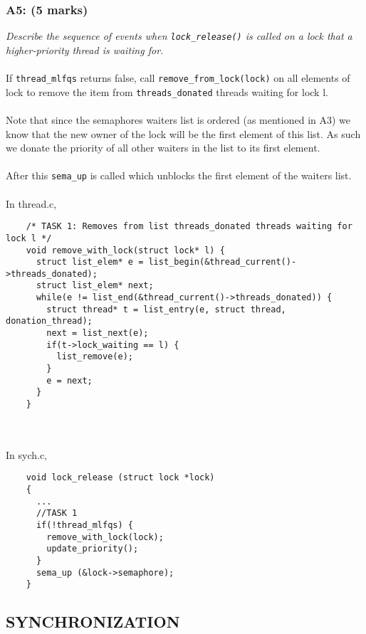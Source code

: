 \documentclass{article}
\begin{document}
\subsubsection*{A5: (5 marks) }
\textit{Describe the sequence of events when \texttt{lock\_release()} is called on a lock that a higher-priority thread is waiting for.}
\\ \\
If \texttt{thread\_mlfqs} returns false, call \texttt{remove\_from\_lock(lock)} on all elements of lock to remove the item from \texttt{threads\_donated} threads waiting for lock l.
\\ \\
Note that since the semaphores waiters list is ordered (as mentioned in A3) we know that the new owner of the lock will be the first element of this list. As such we donate the priority of all other waiters in the list to its first element.
\\ \\
After this \texttt{sema\_up} is called which unblocks the first element of the waiters list.
\\ \\
In thread.c,
\begin{lstlisting}
    /* TASK 1: Removes from list threads_donated threads waiting for lock l */
    void remove_with_lock(struct lock* l) {
      struct list_elem* e = list_begin(&thread_current()->threads_donated);
      struct list_elem* next;
      while(e != list_end(&thread_current()->threads_donated)) {
        struct thread* t = list_entry(e, struct thread, donation_thread);
        next = list_next(e);
        if(t->lock_waiting == l) {
          list_remove(e);
        }
        e = next;
      }
    }
\end{lstlisting}
\\\\
In sych.c,
\begin{lstlisting}
    void lock_release (struct lock *lock)
    {
      ...
      //TASK 1
      if(!thread_mlfqs) {
        remove_with_lock(lock);
        update_priority();
      }
      sema_up (&lock->semaphore);
    }

\end{lstlisting}



\subsection{SYNCHRONIZATION}
\end{document}
